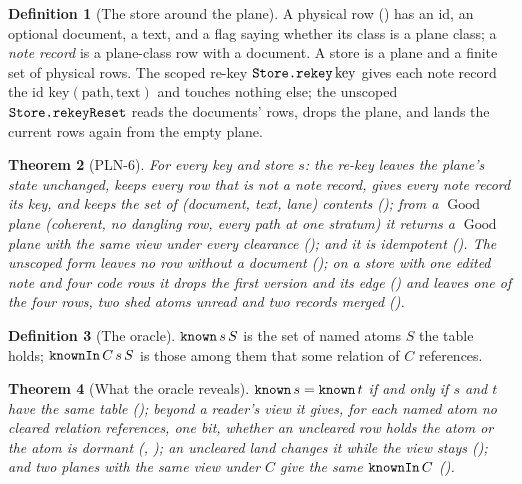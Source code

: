 \documentclass[11pt]{article}
\theoremstyle{plain}
\newtheorem{theorem}{Theorem}[section]
\theoremstyle{definition}
\newtheorem{definition}[theorem]{Definition}
\theoremstyle{remark}
\newcommand{\mlean}[1]{\text{\texttt{#1}}}
\begin{document}
\begin{definition}[The store around the plane]
A physical row () has an id, an optional document, a text, and a flag
saying whether its class is a plane class; a \emph{note record} is a plane-class row with a
document. A store is a plane and a finite set of physical rows. The scoped re-key
$\mlean{Store.rekey}\,\mathrm{key}$ gives each note record the id $\mathrm{key}(\mathrm{path},
\mathrm{text})$ and touches nothing else; the unscoped $\mlean{Store.rekeyReset}$ reads the
documents' rows, drops the plane, and lands the current rows again from the empty plane.
\end{definition}

\begin{theorem}[PLN-6]\label{thm:rekey}
For every key and store $s$: the re-key leaves the plane's state unchanged, keeps every row that
is not a note record, gives every note record its key, and keeps the set of (document, text, lane)
contents (); from a $\operatorname{Good}$ plane
(coherent, no dangling row, every path at one stratum) it returns a $\operatorname{Good}$ plane
with the same view under every clearance (); and it is idempotent
(). The unscoped form leaves no row without a document
(); on a store with one edited note and four code rows it
drops the first version and its edge () and leaves one of
the four rows, two shed atoms unread and two records merged ().
\end{theorem}

\begin{definition}[The oracle]
$\mlean{known}\,s\,S$ is the set of named atoms $S$ the table holds; $\mlean{knownIn}\,C\,s\,S$ is
those among them that some relation of $C$ references.
\end{definition}

\begin{theorem}[What the oracle reveals]\label{thm:known}
$\mlean{known}\,s = \mlean{known}\,t$ if and only if $s$ and $t$ have the same table
(); beyond a reader's view it gives, for each named atom no
cleared relation references, one bit, whether an uncleared row holds the atom or the atom is
dormant (, ); an uncleared land changes it while the view stays
(); and two planes with the same view under $C$ give the same
$\mlean{knownIn}\,C$ ().
\end{theorem}
\end{document}
